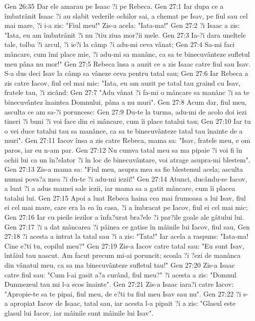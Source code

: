 Gen 26:35  Dar ele amarau pe Isaac ?i pe Rebeca.
Gen 27:1  Iar dupa ce a îmbatrânit Isaac ?i au slabit vederile ochilor sai, a chemat pe Isav, pe fiul sau cel mai mare, ?i i-a zis: "Fiul meu!" Zis-a acela: "Iata-ma!"
Gen 27:2  ?i Isaac a zis: "Iata, eu am îmbatrânit ?i nu ?tiu ziua mor?ii mele.
Gen 27:3  Ia-?i dara uneltele tale, tolba ?i arcul, ?i ie?i la câmp ?i adu-mi ceva vânat;
Gen 27:4  Sa-mi faci mâncare, cum îmi place mie, ?i adu-mi sa manânc, ca sa te binecuvânteze sufletul meu pâna nu mor!"
Gen 27:5  Rebeca însa a auzit ce a zis Isaac catre fiul sau Isav. S-a dus deci Isav la câmp sa vâneze ceva pentru tatal sau;
Gen 27:6  Iar Rebeca a zis catre Iacov, fiul cel mai mic: "Iata, eu am auzit pe tatal tau graind cu Isav, fratele tau, ?i zicând:
Gen 27:7  "Adu vânat ?i fa-mi o mâncare sa manânc ?i sa te binecuvântez înaintea Domnului, pâna a nu muri".
Gen 27:8  Acum dar, fiul meu, asculta ce am sa-?i poruncesc:
Gen 27:9  Du-te la turma, adu-mi de acolo doi iezi tineri ?i buni ?i voi face din ei mâncare, cum îi place tatalui tau;
Gen 27:10  Iar tu o vei duce tatalui tau sa manânce, ca sa te binecuvânteze tatal tau înainte de a muri".
Gen 27:11  Iacov însa a zis catre Rebeca, mama sa: "Isav, fratele meu, e om paros, iar eu n-am par.
Gen 27:12  Nu cumva tatal meu sa ma pipaie ?i voi fi în ochii lui ca un în?elator ?i în loc de binecuvântare, voi atrage asupra-mi blestem".
Gen 27:13  Zis-a mama sa: "Fiul meu, asupra mea sa fie blestemul acela; asculta numai pova?a mea ?i du-te ?i adu-mi iezii!"
Gen 27:14  Atunci, ducându-se Iacov, a luat ?i a adus mamei sale iezii, iar mama sa a gatit mâncare, cum îi placea tatalui lui.
Gen 27:15  Apoi a luat Rebeca haina cea mai frumoasa a lui Isav, fiul ei cel mai mare, care era la ea în casa, ?i a îmbracat pe Iacov, fiul ei cel mai mic;
Gen 27:16  Iar cu pieile iezilor a înfa?urat bra?ele ?i par?ile goale ale gâtului lui.
Gen 27:17  ?i a dat mâncarea ?i pâinea ce gatise în mâinile lui Iacov, fiul sau,
Gen 27:18  ?i acesta a intrat la tatal sau ?i a zis: "Tata!" Iar acela a raspuns: "Iata-ma! Cine e?ti tu, copilul meu?"
Gen 27:19  Zis-a Iacov catre tatal sau: "Eu sunt Isav, întâiul tau nascut. Am facut precum mi-ai poruncit; scoala ?i ?ezi de manânca din vânatul meu, ca sa ma binecuvânteze sufletul tau!"
Gen 27:20  Zis-a Isaac catre fiul sau: "Cum l-ai gasit a?a curând, fiul meu?" ?i acesta a zis: "Domnul Dumnezeul tau mi l-a scos înainte".
Gen 27:21  Zis-a Isaac iara?i catre Iacov: "Apropie-te sa te pipai, fiul meu, de e?ti tu fiul meu Isav sau nu".
Gen 27:22  ?i s-a apropiat Iacov de Isaac, tatal sau, iar acesta l-a pipait ?i a zis: "Glasul este glasul lui Iacov, iar mâinile sunt mâinile lui Isav".
